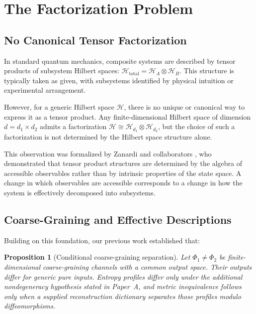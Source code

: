\documentclass[12pt,a4paper,openany]{book}
\newtheorem{proposition}[theorem]{Proposition}
\begin{document}
\section{The Factorization Problem}
\label{D-sec:factorization}

\subsection{No Canonical Tensor Factorization}

In standard quantum mechanics, composite systems are described by tensor products of subsystem Hilbert spaces: $\mathcal{H}_{\text{total}} = \mathcal{H}_A \otimes \mathcal{H}_B$. This structure is typically taken as given, with subsystems identified by physical intuition or experimental arrangement.

However, for a generic Hilbert space $\mathcal{H}$, there is no unique or canonical way to express it as a tensor product. Any finite-dimensional Hilbert space of dimension $d = d_1 \times d_2$ admits a factorization $\mathcal{H} \cong \mathcal{H}_{d_1} \otimes \mathcal{H}_{d_2}$, but the choice of such a factorization is not determined by the Hilbert space structure alone.

This observation was formalized by Zanardi and collaborators \cite{Zanardi2001,Zanardi2004}, who demonstrated that tensor product structures are determined by the algebra of accessible observables rather than by intrinsic properties of the state space. A change in which observables are accessible corresponds to a change in how the system is effectively decomposed into subsystems.

\subsection{Coarse-Graining and Effective Descriptions}

Building on this foundation, our previous work \cite{Liu2026PaperA} established that:

\begin{proposition}[Conditional coarse-graining separation]
\label{D-prop:inequiv}
Let $\Phi_1\ne\Phi_2$ be finite-dimensional coarse-graining channels with a common output space.  Their outputs differ for generic pure inputs.  Entropy profiles differ only under the additional nondegeneracy hypothesis stated in Paper~A, and metric inequivalence follows only when a supplied reconstruction dictionary separates those profiles modulo diffeomorphisms.
\end{proposition}
\end{document}

